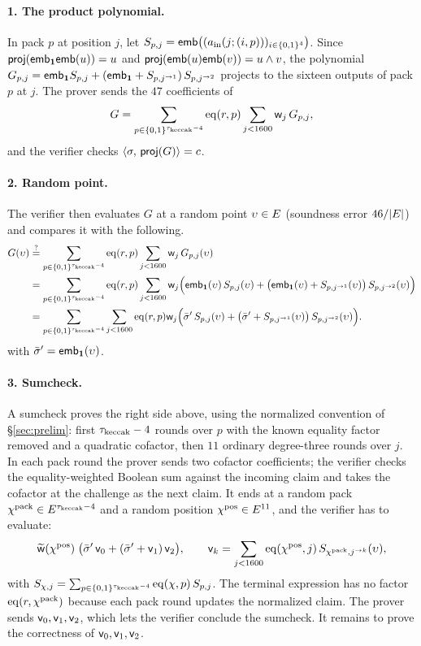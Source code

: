 \paragraph{1. The product polynomial.} In pack $p$ at position $j$, let $S_{p,j}=\mathsf{emb}\bigl((a_{\mathrm{in}}(j;(i,p)))_{i\in\{0,1\}^{4}}\bigr)$. Since $\mathsf{proj}(\mathsf{emb}_{\mathbf{1}}\mathsf{emb}(u))=u$ and $\mathsf{proj}(\mathsf{emb}(u)\mathsf{emb}(v))=u\wedge v$, the polynomial $G_{p,j}=\mathsf{emb}_{\mathbf{1}}S_{p,j}+(\mathsf{emb}_{\mathbf{1}}+S_{p,j^{\rightarrow 1}})\,S_{p,j^{\rightarrow 2}}$ projects to the sixteen outputs of pack $p$ at $j$. The prover sends the $47$ coefficients of
\[
G=\sum_{p\in\{0,1\}^{\tau_{\mathrm{keccak}}-4}}\operatorname{eq}(r,p)\sum_{j<1600}\mathsf{w}_j\,G_{p,j},
\]
and the verifier checks $\langle \sigma,\, \mathsf{proj}(G) \rangle=c$.

\paragraph{2. Random point.} The verifier then evaluates $G$ at a random point $\upsilon\in E$ (soundness error $46/|E|$) and compares it with the following.
\begin{align*}
G(\upsilon)&\stackrel{?}{=}\sum_{p\in\{0,1\}^{\tau_{\mathrm{keccak}}-4}}\operatorname{eq}(r,p)\sum_{j<1600}\mathsf{w}_j\,G_{p,j}(\upsilon)\\
&=\sum_{p\in\{0,1\}^{\tau_{\mathrm{keccak}}-4}}\operatorname{eq}(r,p)\sum_{j<1600}\mathsf{w}_j\Bigl(\mathsf{emb}_{\mathbf{1}}(\upsilon)\,S_{p,j}(\upsilon)+\bigl(\mathsf{emb}_{\mathbf{1}}(\upsilon)+S_{p,j^{\rightarrow 1}}(\upsilon)\bigr)\,S_{p,j^{\rightarrow 2}}(\upsilon)\Bigr)\\
&=\sum_{p\in\{0,1\}^{\tau_{\mathrm{keccak}}-4}}\sum_{j<1600}\operatorname{eq}(r,p)\mathsf{w}_j\Bigl(\bar{\sigma}'\,S_{p,j}(\upsilon)+\bigl(\bar{\sigma}'+S_{p,j^{\rightarrow 1}}(\upsilon)\bigr)\,S_{p,j^{\rightarrow 2}}(\upsilon)\Bigr).
\end{align*}
with $\bar{\sigma}'=\mathsf{emb}_{\mathbf{1}}(\upsilon)$.

\paragraph{3. Sumcheck.} A sumcheck proves the right side above, using the normalized convention of \S\ref{sec:prelim}: first $\tau_{\mathrm{keccak}}-4$ rounds over $p$ with the known equality factor removed and a quadratic cofactor, then $11$ ordinary degree-three rounds over $j$. In each pack round the prover sends two cofactor coefficients; the verifier checks the equality-weighted Boolean sum against the incoming claim and takes the cofactor at the challenge as the next claim. It ends at a random pack $\chi^{\mathrm{pack}}\in E^{\tau_{\mathrm{keccak}}-4}$ and a random position $\chi^{\mathrm{pos}}\in E^{11}$, and the verifier has to evaluate:
\[
\widetilde{\mathsf{w}}(\chi^{\mathrm{pos}})\;\bigl(\bar{\sigma}'\,\mathsf{v}_0+(\bar{\sigma}'+\mathsf{v}_1)\,\mathsf{v}_2\bigr),\qquad
\mathsf{v}_k=\sum_{j<1600}\operatorname{eq}(\chi^{\mathrm{pos}},j)\,S_{\chi^{\mathrm{pack}},j^{\rightarrow k}}(\upsilon),
\]
with $S_{\chi,j}=\sum_{p\in\{0,1\}^{\tau_{\mathrm{keccak}}-4}}\operatorname{eq}(\chi,p)\,S_{p,j}$. The terminal expression has no factor $\operatorname{eq}(r,\chi^{\mathrm{pack}})$ because each pack round updates the normalized claim. The prover sends $\mathsf{v}_0,\mathsf{v}_1,\mathsf{v}_2$, which lets the verifier conclude the sumcheck. It remains to prove the correctness of $\mathsf{v}_0,\mathsf{v}_1,\mathsf{v}_2$.

